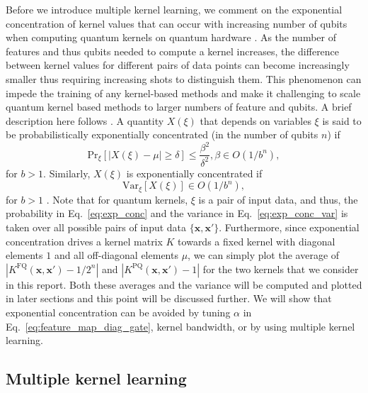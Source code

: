 \documentclass[reprint,amsfonts, amssymb, amsmath,  showkeys, nofootinbib,pra, superscriptaddress, twocolumn,longbibliography]{revtex4-2}
\renewcommand{\vec}[1]{\boldsymbol{#1}}  %
\begin{document}
Before we introduce multiple kernel learning, we comment on the exponential concentration of kernel values that can occur with increasing number of qubits when computing quantum kernels on quantum hardware \cite{thanasilp2022exponential}.  As the number of features and thus qubits needed to compute a kernel increases, the difference between kernel values for different pairs of data points can become increasingly smaller thus requiring increasing shots to distinguish them.  This phenomenon can impede the training of any kernel-based methods and make it challenging to scale quantum kernel based methods to larger numbers of feature and qubits. A brief description here follows  \cite{thanasilp2022exponential}.
A quantity $X(\xi)$ that depends on variables $\xi$ is said to be probabilistically exponentially concentrated (in the number of qubits $n$) if 
\begin{equation}
  \label{eq:exp_conc}
  \text{Pr}_\xi\left[ |X(\xi)-\mu|\ge \delta \right]\le \frac{\beta^2}{\delta^2}, \beta\in O(1/b^n),
\end{equation}
for $b>1$.
Similarly, $X(\xi)$ is exponentially concentrated if
\begin{equation}
  \label{eq:exp_conc_var}
  \text{Var}_\xi\left[ X(\xi) \right] \in  O(1/b^n),
\end{equation}
for $b>1$ \cite{thanasilp2022exponential}.
Note that for quantum kernels, $\xi$ is a pair of input data, and thus, the probability in Eq.~\ref{eq:exp_conc} and the variance in Eq.~\ref{eq:exp_conc_var} is taken over all possible pairs of input data $\{\vec{x},\vec{x}'\}$.
Furthermore, since exponential concentration drives a kernel matrix $K$ towards a fixed kernel with diagonal elements $1$ and all off-diagonal elements $\mu$, we can simply plot the average of $|K^{\text{FQ}}(\vec{x},\vec{x}')-1/2^n|$ and $|K^{\text{PQ}}(\vec{x},\vec{x}')-1|$ for the two kernels that we consider in this report.
Both these averages and the variance will be computed and plotted in later sections and this point will be discussed further. We will show that exponential concentration can be avoided by tuning $\alpha$ in Eq.~\ref{eq:feature_map_diag_gate}, kernel bandwidth, or by using multiple kernel learning.

\subsection{Multiple kernel learning}\label{kernel_alignment}
\end{document}
